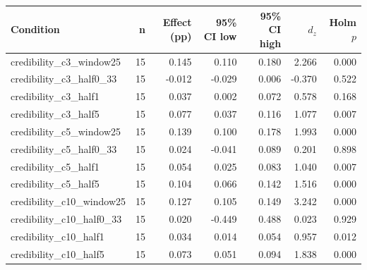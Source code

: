 \begin{tabular}{lrrrrrr}
\toprule
Condition & n & Effect (pp) & 95\% CI low & 95\% CI high & $d_z$ & Holm $p$ \\
\midrule
credibility_c3_window25 & 15 & 0.145 & 0.110 & 0.180 & 2.266 & 0.000 \\
credibility_c3_half0_33 & 15 & -0.012 & -0.029 & 0.006 & -0.370 & 0.522 \\
credibility_c3_half1 & 15 & 0.037 & 0.002 & 0.072 & 0.578 & 0.168 \\
credibility_c3_half5 & 15 & 0.077 & 0.037 & 0.116 & 1.077 & 0.007 \\
credibility_c5_window25 & 15 & 0.139 & 0.100 & 0.178 & 1.993 & 0.000 \\
credibility_c5_half0_33 & 15 & 0.024 & -0.041 & 0.089 & 0.201 & 0.898 \\
credibility_c5_half1 & 15 & 0.054 & 0.025 & 0.083 & 1.040 & 0.007 \\
credibility_c5_half5 & 15 & 0.104 & 0.066 & 0.142 & 1.516 & 0.000 \\
credibility_c10_window25 & 15 & 0.127 & 0.105 & 0.149 & 3.242 & 0.000 \\
credibility_c10_half0_33 & 15 & 0.020 & -0.449 & 0.488 & 0.023 & 0.929 \\
credibility_c10_half1 & 15 & 0.034 & 0.014 & 0.054 & 0.957 & 0.012 \\
credibility_c10_half5 & 15 & 0.073 & 0.051 & 0.094 & 1.838 & 0.000 \\
\bottomrule
\end{tabular}
